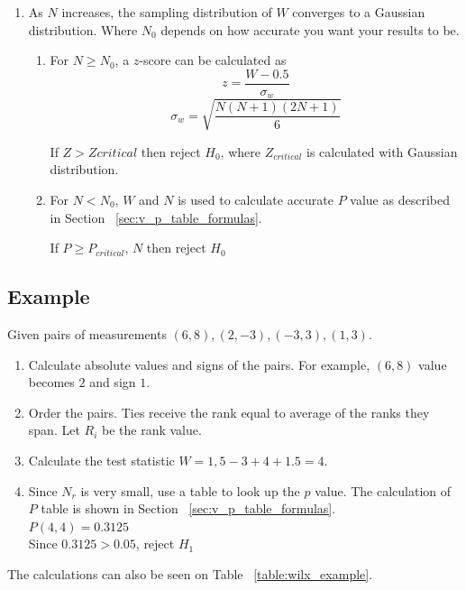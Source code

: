 \documentclass[12pt]{article}
\begin{document}
{\begin{enumerate}
\item
As $N$ increases, the sampling distribution of $W$ converges to a Gaussian distribution. Where $N_0$ depends on how accurate you want your results to be.
\begin{enumerate}
\item
For $N \geq N_0$, a $z$-score can be calculated as
\begin{equation}
  z=\frac{W-0.5}{\sigma_w}
\end{equation}
\begin{equation}
  \sigma_w = \sqrt{\frac{N(N + 1)(2N + 1)}{6}}
\end{equation}

If $Z > Zcritical$ then reject $H_0$, where $Z_{critical}$ is calculated with Gaussian distribution.

\item
For $N < N_0$, $W$ and $N$ is used to calculate accurate $P$ value as described in Section ~\ref{sec:v_p_table_formulas}.

If $ P \geq P_{critical}$, $N$ then reject $H_0$
\end{enumerate}
\end{enumerate}

\subsection{Example}
Given pairs of measurements $(6, 8), (2, -3), (-3, 3), (1, 3)$.

\begin{enumerate}
\item Calculate absolute values and signs of the pairs. For example, $(6, 8)$ value becomes $2$ and sign $1$.
\item Order the pairs. Ties receive the rank equal to average of the ranks they span. Let $R_i$ be the rank value.
\item Calculate the test statistic $W=1,5-3+4+1.5=4$.
\item Since $N_r$ is very small, use a table to look up the $p$ value. The calculation of $P$ table is shown in Section ~\ref{sec:v_p_table_formulas}. \\
$P(4, 4) = 0.3125$ \\
Since $0.3125 > 0.05$, reject $H_1$
\end{enumerate}

The calculations can also be seen on Table ~\ref{table:wilx_example}.

}
\end{document}
